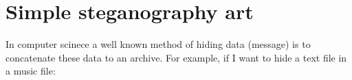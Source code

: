 \section{Simple steganography art}
In computer scinece a well known method of hiding data (message) is to
concatenate these data to an archive. For example, if I want to hide a
text file in a music file: